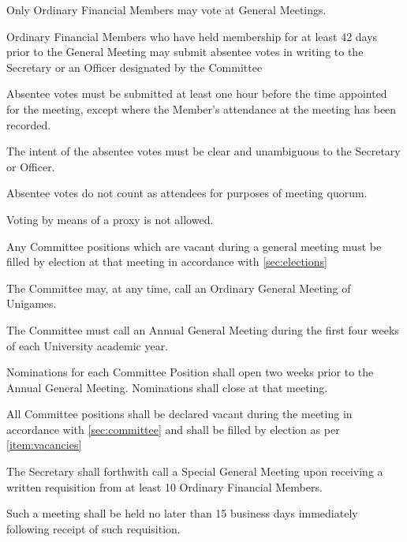 \documentclass[a4paper]{article}
\begin{document}
\begin{myEnumerate}
    \item Only Ordinary Financial Members may vote at General Meetings.
        \begin{myEnumerate}
            \item Ordinary Financial Members who have held membership for at least 42 days prior to the General Meeting may submit absentee votes in writing to the Secretary or an Officer designated by the Committee
            \begin{myEnumerate}
                \item Absentee votes must be submitted at least one hour before the time appointed for the meeting, except where the Member’s attendance at the meeting has been recorded.
                \item The intent of the absentee votes must be clear and unambiguous to the Secretary or Officer.
            \end{myEnumerate}
            \item Absentee votes do not count as attendees for purposes of meeting quorum.
            \item Voting by means of a proxy is not allowed.
        \end{myEnumerate}
    \item \label{item:vacancies} Any Committee positions which are vacant during a general meeting must be filled by election at that meeting in accordance with \cref{sec:elections}
    \item The Committee may, at any time, call an Ordinary General Meeting of Unigames.
    \item The Committee must call an Annual General Meeting during the first four weeks of each University academic year.
        \begin{myEnumerate}
            \item Nominations for each Committee Position shall open two weeks prior to the Annual General Meeting. Nominations shall close at that meeting.
            \item All Committee positions shall be declared vacant during the meeting in accordance with \cref{sec:committee} and shall be filled by election as per \cref{item:vacancies}
        \end{myEnumerate}
    \item The Secretary shall forthwith call a Special General Meeting upon receiving a written requisition from at least 10 Ordinary Financial Members.
        \begin{myEnumerate}
            \item Such a meeting shall be held no later than 15 business days immediately following receipt of such requisition.

\end{myEnumerate}
\end{myEnumerate}
\end{document}
